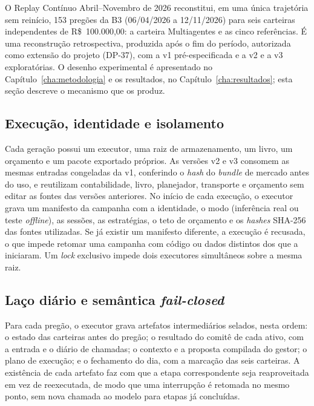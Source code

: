 O Replay Contínuo Abril--Novembro de 2026 reconstitui, em uma única trajetória sem reinício, 153 pregões da B3 (06/04/2026 a 12/11/2026) para seis carteiras independentes de R\$~100.000,00: a carteira Multiagentes e as cinco referências. É uma reconstrução retrospectiva, produzida após o fim do período, autorizada como extensão do projeto (\mbox{DP-37}), com a v1 pré-especificada e a v2 e a v3 exploratórias. O desenho experimental é apresentado no Capítulo~\ref{cha:metodologia} e os resultados, no Capítulo~\ref{cha:resultados}; esta seção descreve o mecanismo que os produz.

\subsection{Execução, identidade e isolamento}

Cada geração possui um executor, uma raiz de armazenamento, um livro, um orçamento e um pacote exportado próprios. As versões v2 e v3 consomem as mesmas entradas congeladas da v1, conferindo o \textit{hash} do \textit{bundle} de mercado antes do uso, e reutilizam contabilidade, livro, planejador, transporte e orçamento sem editar as fontes das versões anteriores. No início de cada execução, o executor grava um manifesto da campanha com a identidade, o modo (inferência real ou teste \textit{offline}), as sessões, as estratégias, o teto de orçamento e os \textit{hashes} SHA-256 das fontes utilizadas. Se já existir um manifesto diferente, a execução é recusada, o que impede retomar uma campanha com código ou dados distintos dos que a iniciaram. Um \textit{lock} exclusivo impede dois executores simultâneos sobre a mesma raiz.

\subsection{Laço diário e semântica \textit{fail-closed}}

Para cada pregão, o executor grava artefatos intermediários selados, nesta ordem: o estado das carteiras antes do pregão; o resultado do comitê de cada ativo, com a entrada e o diário de chamadas; o contexto e a proposta compilada do gestor; o plano de execução; e o fechamento do dia, com a marcação das seis carteiras. A existência de cada artefato faz com que a etapa correspondente seja reaproveitada em vez de reexecutada, de modo que uma interrupção é retomada no mesmo ponto, sem nova chamada ao modelo para etapas já concluídas.

